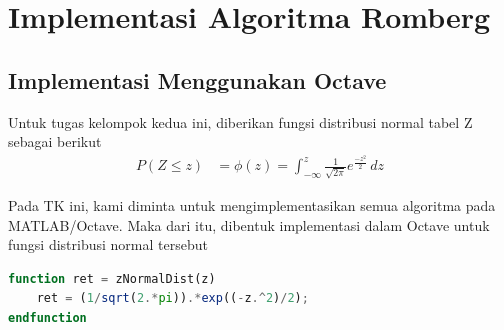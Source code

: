 \documentclass[journal,12pt,onecolumn,a4paper]{IEEEtran}
\begin{document}
\section{Implementasi Algoritma Romberg}

\subsection{Implementasi Menggunakan Octave}

\par Untuk tugas kelompok kedua ini, diberikan fungsi distribusi normal tabel Z sebagai berikut
\begin{equation*}
	\begin{split}
		P(Z \le z ) & = \phi(z) = \int_{-\infty}^{z} \frac{1}{\sqrt{2\pi}}e ^{\frac{-z^2}{2}} \,dz
	\end{split}
\end{equation*}

Pada TK ini, kami diminta untuk mengimplementasikan semua algoritma pada MATLAB/Octave. Maka dari itu, dibentuk implementasi dalam Octave untuk fungsi distribusi normal tersebut

\begin{center}
	\begin{lstlisting}[language=Octave]
function ret = zNormalDist(z)
	ret = (1/sqrt(2.*pi)).*exp((-z.^2)/2);
endfunction
	\end{lstlisting}
\end{center}
\end{document}
